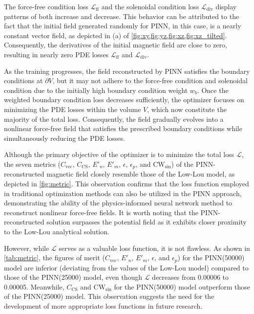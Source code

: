 The force-free condition loss $\mathcal{L}_\text{ff}$ and the solenoidal condition loss $\mathcal{L}_\text{div}$ display patterns of both increase and decrease. This behavior can be attributed to the fact that the initial field generated randomly for PINN, in this case, is a nearly constant vector field, as depicted in (a) of \cref{fig:xy,fig:yz,fig:xz,fig:xz_tilted}. Consequently, the derivatives of the initial magnetic field are close to zero, resulting in nearly zero PDE losses $\mathcal{L}_\text{ff}$ and $\mathcal{L}_\text{div}$.

As the training progresses, the field reconstructed by PINN satisfies the boundary conditions at $\partial V$, but it may not adhere to the force-free condition and solenoidal condition due to the initially high boundary condition weight $w_b$. Once the weighted boundary condition loss decreases sufficiently, the optimizer focuses on minimizing the PDE losses within the volume $V$, which now constitute the majority of the total loss. Consequently, the field gradually evolves into a nonlinear force-free field that satisfies the prescribed boundary conditions while simultaneously reducing the PDE losses. 

Although the primary objective of the optimizer is to minimize the total loss $\mathcal{L}$, the seven metrics ($C_\text{vec}$, $C_\text{CS}$, $E'_n$, $E'_m$, $\epsilon$, $\epsilon_p$, and $\text{CW}_\text{sin}$) of the PINN-reconstructed magnetic field closely resemble those of the Low-Lou model, as depicted in \cref{fig:metric}. This observation confirms that the loss function employed in traditional optimization methods can also be utilized in the PINN approach, demonstrating the ability of the physics-informed neural network method to reconstruct nonlinear force-free fields. It is worth noting that the PINN-reconstructed solution surpasses the potential field as it exhibits closer proximity to the Low-Lou analytical solution.

However, while $\mathcal{L}$ serves as a valuable loss function, it is not flawless. As shown in \cref{tab:metric}, the figures of merit ($C_\text{vec}$, $E'_n$, $E'_m$, $\epsilon$, and $\epsilon_p$) for the PINN(50000) model are inferior (deviating from the values of the Low-Lou model) compared to those of the PINN(25000) model, even though $\mathcal{L}$ decreases from 0.00006 to 0.00005. Meanwhile, $C_\text{CS}$ and $\text{CW}_\text{sin}$ for the PINN(50000) model outperform those of the PINN(25000) model. This observation suggests the need for the development of more appropriate loss functions in future research.

